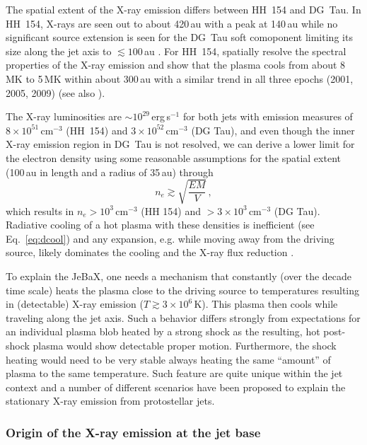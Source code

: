 \documentclass[graybox, nosecnum]{svmult}
\begin{document}
The spatial extent of the X-ray emission differs between HH~154 and DG~Tau. In
HH~154, X-rays are seen out to about 420\,au with a peak at 140\,au \citep{Schneider_2011} while no significant source extension is seen for the DG~Tau soft comoponent limiting its size along the jet axis to $\lesssim100\,$au \citep{Schneider_2008}. For HH~154, \citet{Schneider_2011} spatially resolve the spectral properties of the X-ray emission and show that the plasma cools from about 8\,MK to 5\,MK within about 300\,au with a similar trend in all three epochs (2001, 2005, 2009) (see also \cite{Bonito_2011}).


The X-ray luminosities are $\sim10^{29}$\,erg\,s$^{-1}$ for both jets with emission measures of $8\times10^{51}\,$cm$^{-3}$ (HH~154) and $3\times10^{52}$\,cm$^{-3}$ (DG Tau), and even though the inner X-ray emission region in DG~Tau is not resolved, we can derive a lower limit for the electron density using some reasonable assumptions for the spatial extent (100\,au in length and a radius of 35\,au) through 
\begin{equation}
n_e \gtrsim \sqrt{\frac{EM}{V}}\,,
\end{equation}
which results in $n_e>10^3\,$cm$^{-3}$  (HH 154) and $>3\times10^3\,$cm$^{-3}$ (DG Tau). Radiative cooling of a hot plasma with these densities is inefficient  (see Eq.~\ref{eq:dcool}) and any expansion, e.g. while moving away from the driving source, likely dominates the cooling and the X-ray flux reduction \citep{Guedel_2008, Schneider_2011}. 

To explain the JeBaX, one needs a mechanism that constantly (over the decade time scale)  heats the plasma close to the driving source to temperatures resulting in (detectable) X-ray emission ($T\gtrsim3\times10^6$\,K). This plasma then cools while traveling along the jet axis. Such a behavior differs strongly from expectations for an individual plasma blob heated by a strong shock as the resulting, hot post-shock plasma would show detectable proper motion. Furthermore, the shock heating would need to be very stable always heating the same ``amount'' of plasma to the same temperature. Such feature are quite unique within the jet context and a number of different scenarios have been proposed to explain the stationary X-ray emission from protostellar jets.



\subsubsection{Origin of the X-ray emission at the jet base}
\end{document}

